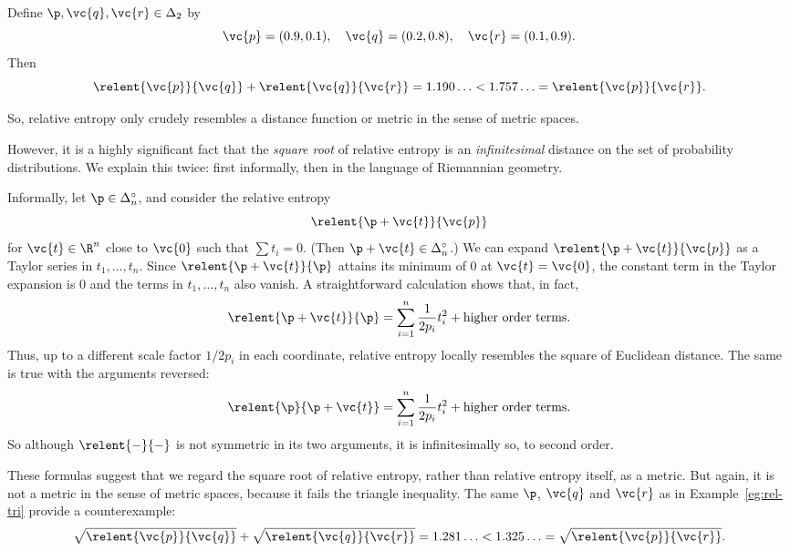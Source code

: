 \begin{example}
Define $\p, \vc{q}, \vc{r} \in \Delta_2$ by 
\[
\vc{p} = (0.9, 0.1),
\quad
\vc{q} = (0.2, 0.8),
\quad
\vc{r} = (0.1, 0.9).
\]
Then
\[
\relent{\vc{p}}{\vc{q}}
+
\relent{\vc{q}}{\vc{r}}
=
1.190\ldots
<
1.757\ldots
=
\relent{\vc{p}}{\vc{r}}.
\]
\end{example}

So, relative entropy only crudely resembles a distance function or metric
in the sense of metric spaces.

However, it is a highly significant fact that the \emph{square root} of
relative entropy is an \emph{infinitesimal} distance on the set of
probability distributions.  We explain this twice: first informally, then
in the language of Riemannian geometry.

Informally, let $\p \in \Delta_n^\circ$, and consider the relative entropy 
\[
\relent{\p + \vc{t}}{\vc{p}}
\]
for $\vc{t} \in \R^n$ close to $\vc{0}$ such that $\sum t_i = 0$.  (Then
$\p + \vc{t} \in \Delta_n^\circ$.)  We can expand $\relent{\p +
  \vc{t}}{\vc{p}}$ as a Taylor series in $t_1, \ldots, t_n$.  Since
$\relent{\p + \vc{t}}{\p}$ attains its minimum of $0$ at $\vc{t} = \vc{0}$,
the constant term in the Taylor expansion is $0$ and the terms in $t_1,
\ldots, t_n$ also vanish.  A straightforward calculation shows that, in
fact,
\[
\relent{\p + \vc{t}}{\p} 
=
\sum_{i = 1}^n \frac{1}{2p_i} t_i^2
+ \text{higher order terms}.
\]
Thus, up to a different scale factor $1/2p_i$ in each coordinate, relative
entropy locally resembles the square of Euclidean distance.  The same
is true with the arguments reversed:
\[
\relent{\p}{\p + \vc{t}}
=
\sum_{i = 1}^n \frac{1}{2p_i} t_i^2
+ \text{higher order terms}.
\]
So although $\relent{-}{-}$ is not symmetric%
% 
% 
in its two arguments, it is infinitesimally so, to second order.

These formulas suggest that we regard the square root of relative entropy,
rather than relative entropy itself, as a metric.  But again, it is not a
metric in the sense of metric spaces, because it fails the triangle%
%
% 
inequality.  The same $\p$, $\vc{q}$ and $\vc{r}$ as in
Example~\ref{eg:rel-tri} provide a counterexample:
\[
\sqrt{\relent{\vc{p}}{\vc{q}}}
+
\sqrt{\relent{\vc{q}}{\vc{r}}}
=
1.281\ldots
<
1.325\ldots
=
\sqrt{\relent{\vc{p}}{\vc{r}}}.
\]
% 
% 
% 


